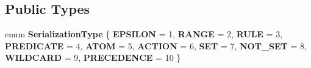 \subsection*{Public Types}
\begin{DoxyCompactItemize}
\item 
\mbox{\label{classantlr4_1_1atn_1_1Transition_a05a5668a4bc551c4ef1a90721fb80843}} 
enum {\bfseries Serialization\+Type} \{ \newline
{\bfseries E\+P\+S\+I\+L\+ON} = 1, 
{\bfseries R\+A\+N\+GE} = 2, 
{\bfseries R\+U\+LE} = 3, 
{\bfseries P\+R\+E\+D\+I\+C\+A\+TE} = 4, 
\newline
{\bfseries A\+T\+OM} = 5, 
{\bfseries A\+C\+T\+I\+ON} = 6, 
{\bfseries S\+ET} = 7, 
{\bfseries N\+O\+T\+\_\+\+S\+ET} = 8, 
\newline
{\bfseries W\+I\+L\+D\+C\+A\+RD} = 9, 
{\bfseries P\+R\+E\+C\+E\+D\+E\+N\+CE} = 10
 \}
\end{DoxyCompactItemize}
